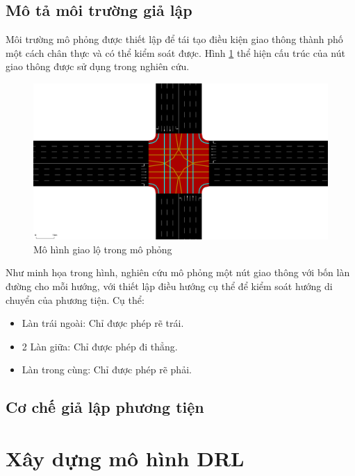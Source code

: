 \subsection{Mô tả môi trường giả lập}
Môi trường mô phỏng được thiết lập để tái tạo điều kiện giao thông thành phố một cách chân thực và có thể kiểm soát được. Hình \ref{fig:sumo_map} thể hiện cấu trúc của nút giao thông được sử dụng trong nghiên cứu.

\begin{figure}[!htp]
    \centering
    \includegraphics[width=\textwidth]{figures/sumo_map}
    \caption{Mô hình giao lộ trong mô phỏng}
    \label{fig:sumo_map}
\end{figure}

Như minh họa trong hình, nghiên cứu mô phỏng một nút giao thông với bốn làn đường cho mỗi hướng, với thiết lập điều hướng cụ thể để kiểm soát hướng di chuyển của phương tiện. Cụ thể:
\begin{itemize}
    \item Làn trái ngoài: Chỉ được phép rẽ trái.

    \item 2 Làn giữa: Chỉ được phép đi thẳng.

    \item Làn trong cùng: Chỉ được phép rẽ phải.
\end{itemize}
\subsection{Cơ chế giả lập phương tiện}



\section{Xây dựng mô hình DRL}
